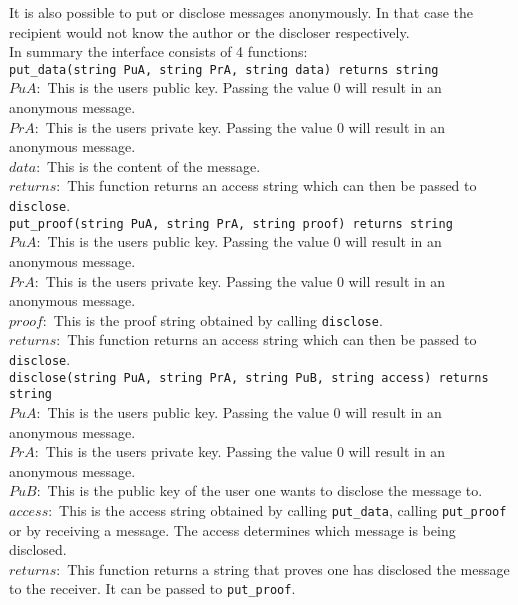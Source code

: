 \documentclass[a4paper]{article} %
\begin{document}
It is also possible to put or disclose messages anonymously. In that case the recipient would not know the author or the discloser respectively. \\

\noindent In summary the interface consists of 4 functions:\\

\noindent \lstinline{put_data(string PuA, string PrA, string data) returns string} \\
$PuA :$ This is the users public key. Passing the value 0 will result in an anonymous message. \\
$PrA :$ This is the users private key. Passing the value 0 will result in an anonymous message. \\
$data :$ This is the content of the message. \\
$returns :$ This function returns an access string which can then be passed to \lstinline{disclose}. \\

\noindent\lstinline{put_proof(string PuA, string PrA, string proof) returns string}\\
$PuA :$ This is the users public key. Passing the value 0 will result in an anonymous message. \\
$PrA :$ This is the users private key. Passing the value 0 will result in an anonymous message. \\
$proof :$ This is the proof string obtained by calling \lstinline{disclose}. \\
$returns :$ This function returns an access string which can then be passed to \lstinline{disclose}. \\

\noindent\lstinline{disclose(string PuA, string PrA, string PuB, string access) returns string}\\
$PuA :$ This is the users public key. Passing the value 0 will result in an anonymous message. \\
$PrA :$ This is the users private key. Passing the value 0 will result in an anonymous message. \\
$PuB :$ This is the public key of the user one wants to disclose the message to. \\
$access :$ This is the access string obtained by calling \lstinline{put_data}, calling \lstinline{put_proof} or by receiving a message. The access determines which message is being disclosed.\\
$returns :$ This function returns a string that proves one has disclosed the message to the receiver. It can be passed to \lstinline{put_proof}. \\
\end{document}
